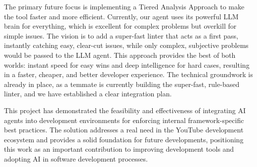 \begin{spacing}{1.2}
The primary future focus is implementing a Tiered Analysis Approach to make the tool faster and more efficient. Currently, our agent uses its powerful LLM brain for everything, which is excellent for complex problems but overkill for simple issues. The vision is to add a super-fast linter that acts as a first pass, instantly catching easy, clear-cut issues, while only complex, subjective problems would be passed to the LLM agent. This approach provides the best of both worlds: instant speed for easy wins and deep intelligence for hard cases, resulting in a faster, cheaper, and better developer experience. The technical groundwork is already in place, as a temmate is currently building the super-fast, rule-based linter, and we have established a clear integration plan.

This project has demonstrated the feasibility and effectiveness of integrating AI agents into development environments for enforcing internal framework-specific best practices. The solution addresses a real need in the YouTube development ecosystem and provides a solid foundation for future developments, positioning this work as an important contribution to improving development tools and adopting AI in software development processes.

\end{spacing}